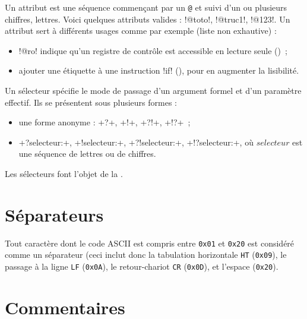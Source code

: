 Un attribut est une séquence commençant par un \texttt{@} et suivi d'un ou plusieurs chiffres, lettres. Voici quelques attributs valides : \plm!@toto!, \plm!@truc1!, \plm!@123!. Un attribut sert à différents usages comme par exemple (liste non exhautive) :
\begin{itemize}
  \item \plm!@ro! indique qu'un registre de contrôle est accessible en lecture seule ()~;
  \item ajouter une étiquette à une instruction \plm!if! (), pour en augmenter la lisibilité.
\end{itemize}









Un sélecteur spécifie le mode de passage d'un argument formel et d'un paramètre effectif. Ils se présentent sous plusieurs formes :
\begin{itemize}
  \item une forme anonyme : \plm+?+, \plm+!+, \plm+?!+, \plm+!?+~;
  \item \plm+?selecteur:+, \plm+!selecteur:+, \plm+?!selecteur:+, \plm+!?selecteur:+, où $selecteur$ est une séquence de lettres ou de chiffres.
\end{itemize}



Les sélecteurs font l'objet de la .

\section{Séparateurs}

Tout caractère dont le code ASCII est compris entre \texttt{0x01} et \texttt{0x20} est considéré comme un séparateur (ceci inclut donc la tabulation horizontale \texttt{HT} (\texttt{0x09}), le passage à la ligne \texttt{LF} (\texttt{0x0A}), le retour-chariot \texttt{CR} (\texttt{0x0D}), et l’espace (\texttt{0x20}).









\section{Commentaires}

